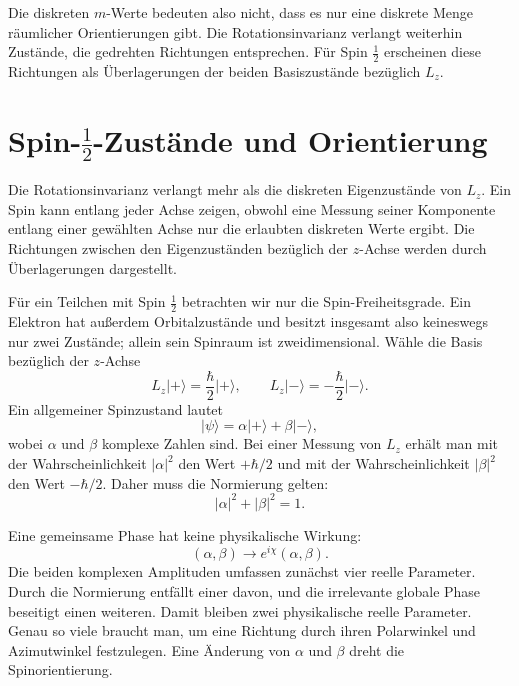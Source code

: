 Die diskreten \(m\)-Werte bedeuten also nicht, dass es nur eine diskrete Menge räumlicher Orientierungen gibt. Die Rotationsinvarianz verlangt weiterhin Zustände, die gedrehten Richtungen entsprechen. Für Spin \(\tfrac12\) erscheinen diese Richtungen als Überlagerungen der beiden Basiszustände bezüglich \(L_z\).

\section{Spin-\texorpdfstring{\(\tfrac12\)}{1/2}-Zustände und Orientierung}

Die Rotationsinvarianz verlangt mehr als die diskreten Eigenzustände von \(L_z\). Ein Spin kann entlang jeder Achse zeigen, obwohl eine Messung seiner Komponente entlang einer gewählten Achse nur die erlaubten diskreten Werte ergibt. Die Richtungen zwischen den Eigenzuständen bezüglich der \(z\)-Achse werden durch Überlagerungen dargestellt.

Für ein Teilchen mit Spin \(\tfrac12\) betrachten wir nur die Spin-Freiheitsgrade. Ein Elektron hat außerdem Orbitalzustände und besitzt insgesamt also keineswegs nur zwei Zustände; allein sein Spinraum ist zweidimensional. Wähle die Basis bezüglich der \(z\)-Achse
\begin{equation}
L_z\lvert+\rangle=\frac{\hbar}{2}\lvert+\rangle,
\qquad
L_z\lvert-\rangle=-\frac{\hbar}{2}\lvert-\rangle.
\end{equation}
Ein allgemeiner Spinzustand lautet
\begin{equation}
\lvert\psi\rangle
=
\alpha\lvert+\rangle+\beta\lvert-\rangle,
\end{equation}
wobei \(\alpha\) und \(\beta\) komplexe Zahlen sind. Bei einer Messung von \(L_z\) erhält man mit der Wahrscheinlichkeit \(|\alpha|^2\) den Wert \(+\hbar/2\) und mit der Wahrscheinlichkeit \(|\beta|^2\) den Wert \(-\hbar/2\). Daher muss die Normierung gelten:
\begin{equation}
|\alpha|^2+|\beta|^2=1.
\end{equation}

Eine gemeinsame Phase hat keine physikalische Wirkung:
\begin{equation}
(\alpha,\beta)\longrightarrow
e^{i\chi}(\alpha,\beta).
\end{equation}
Die beiden komplexen Amplituden umfassen zunächst vier reelle Parameter. Durch die Normierung entfällt einer davon, und die irrelevante globale Phase beseitigt einen weiteren. Damit bleiben zwei physikalische reelle Parameter. Genau so viele braucht man, um eine Richtung durch ihren Polarwinkel und Azimutwinkel festzulegen. Eine Änderung von \(\alpha\) und \(\beta\) dreht die Spinorientierung.

